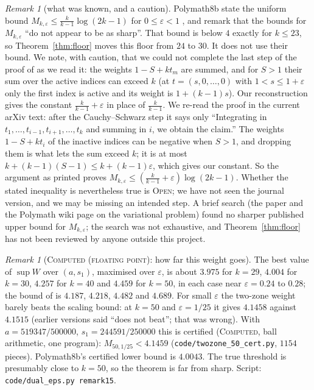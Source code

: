 \documentclass[11pt]{amsart}
\theoremstyle{definition}
\theoremstyle{remark}
\newtheorem{remark}[theorem]{Remark}
\newcommand{\lbl}[1]{\textup{\textsc{#1}}}
\begin{document}
\begin{remark}[what was known, and a caution]
Polymath8b state the uniform bound $M_{k,\varepsilon}\le\frac{k}{k-1}\log(2k-1)$
for $0\le\varepsilon<1$ \cite[Prop.~6.5]{Pol14b}, and remark that the bounds
for $M_{k,\varepsilon}$ ``do not appear to be as sharp''. That bound is below
$4$ exactly for $k\le23$, so Theorem~\ref{thm:floor} moves this floor from $24$
to $30$. It does not use their bound. We note, with caution, that we could not
complete the last step of the proof of \cite[Prop.~6.5]{Pol14b} as we read it:
the weights $1-S+kt_m$ are summed, and for $S>1$ their sum over the active
indices can exceed $k$ (at $t=(s,0,\dots,0)$ with $1<s\le1+\varepsilon$ only
the first index is active and its weight is $1+(k-1)s$). Our reconstruction
gives the constant $\frac{k}{k-1}+\varepsilon$ in place of $\frac{k}{k-1}$. We
re-read the proof in the current arXiv text: after the
Cauchy--Schwarz step it says only ``Integrating in $t_1,\dots,t_{i-1},
t_{i+1},\dots,t_k$ and summing in $i$, we obtain the claim.'' The weights
$1-S+kt_i$ of the inactive indices can be negative when $S>1$, and dropping
them is what lets the sum exceed $k$; it is at most
$k+(k-1)(S-1)\le k+(k-1)\varepsilon$, which gives our constant. So the
argument as printed proves $M_{k,\varepsilon}\le\left(\frac{k}{k-1}+\varepsilon\right)\log(2k-1)$.
Whether the stated inequality is nevertheless true is \lbl{Open}; we have not
seen the journal version, and we may be missing an intended step. A
brief search (the paper \cite{Pol14b} and the Polymath wiki page on the
variational problem) found no sharper published upper bound for
$M_{k,\varepsilon}$; the search was not exhaustive, and
Theorem~\ref{thm:floor} has not been reviewed by anyone outside this project.
\end{remark}

\begin{remark}[\lbl{Computed (floating point)}: how far this weight goes]
The best value of $\sup W$ over $(a,s_1)$, maximised over $\varepsilon$, is
about $3.975$ for $k=29$, $4.004$ for $k=30$, $4.257$ for $k=40$ and $4.459$
for $k=50$, in each case near $\varepsilon=0.24$ to $0.28$; the bound of
\cite[Prop.~6.5]{Pol14b} is $4.187$, $4.218$, $4.482$ and $4.689$. For small
$\varepsilon$ the two-zone weight barely beats the scaling bound: at $k=50$
and $\varepsilon=1/25$ it gives $4.1458$ against $4.1515$ (earlier versions
said ``does not beat''; that was wrong). With $a=519347/500000$,
$s_1=244591/250000$ this is certified (\lbl{Computed}, ball arithmetic, one
program): $M_{50,1/25}<4.1459$ (\texttt{code/twozone\_50\_cert.py},
$1154$ pieces). Polymath8b's certified lower bound is $4.0043$. The true threshold is presumably
close to $k=50$, so the theorem is far from sharp. Script:
\texttt{code/dual\_eps.py remark15}.
\end{remark}
\end{document}

